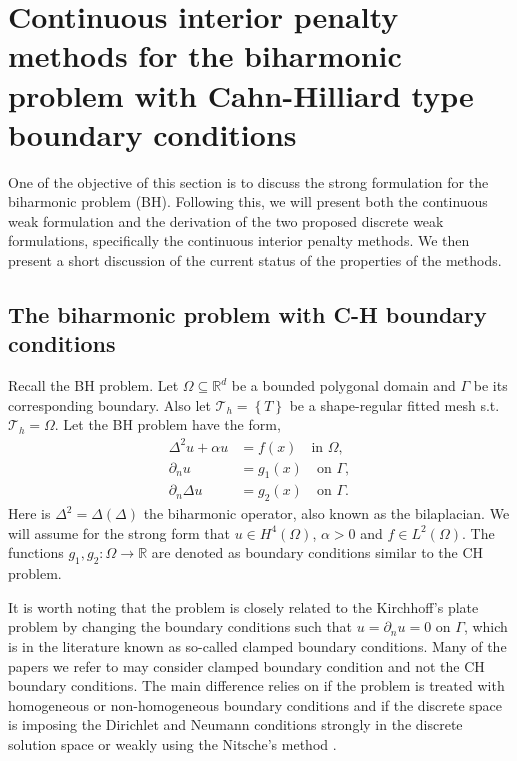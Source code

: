 
\section{Continuous interior penalty methods for the biharmonic problem with Cahn-Hilliard type boundary conditions}%
\label{sec:CIP_biharmonic_problem}

One of the objective of this section is to discuss the strong formulation for the biharmonic problem (BH).
Following this, we will present both the continuous weak formulation and the derivation of the two proposed discrete weak formulations, specifically the continuous interior penalty methods.
We then present a short discussion of the current status of the properties of the methods.

\subsection{The biharmonic problem with C-H boundary conditions}%
\label{sub:the_biharmonic_problem_with_c_h_boundary_conditions}

Recall the BH problem.
Let $\Omega \subseteq    \mathbb{R} ^d$ be a bounded polygonal domain and $\Gamma $ be its corresponding boundary. Also let $\mathcal{T}_{h} = \left\{ T \right\} $ be a shape-regular fitted mesh s.t. $\mathcal{T}_{h} = \Omega $. Let the BH problem have the form,
\begin{subequations}
\begin{align}
    \Delta^2  u  + \alpha  u  & = f( x)  \quad \text{in } \Omega,   \label{eq:bi_problem_a}\\
    \partial _{n} u & = g_{1}(x)   \quad \text{on } \Gamma ,  \label{eq:bi_problem_b}\\
    \partial _{n} \Delta  u & = g_{2}( x)   \quad \text{on } \Gamma .  \label{eq:bi_problem_c}
\end{align}
\label{eq:bi_problem}
\end{subequations}
Here is $\Delta ^2 = \Delta  \left( \Delta  \right) $ the biharmonic operator, also known as the bilaplacian. We will assume for the strong form that $u \in H^{4}\left( \Omega  \right) $, $\alpha  >0 $ and $f \in L^{2}\left( \Omega  \right)
$. The functions $g_{1},g_{2}: \Omega  \to \mathbb{R}$ are denoted as boundary conditions similar to the CH problem.

\begin{remark}
It is worth noting that the problem is closely related to the Kirchhoff's plate problem by changing the boundary conditions such that $u = \partial _{n } u = 0$ on $\Gamma $, which is in the literature known as so-called clamped boundary conditions.
Many of the papers we refer to may consider clamped boundary condition and not the CH boundary conditions. The main difference relies on if the problem is treated with homogeneous or non-homogeneous boundary conditions and if the discrete space is
imposing the Dirichlet and Neumann conditions strongly in the discrete solution space or weakly using the Nitsche's method \cite{nitsche1971variationsprinzip}.
\end{remark}

